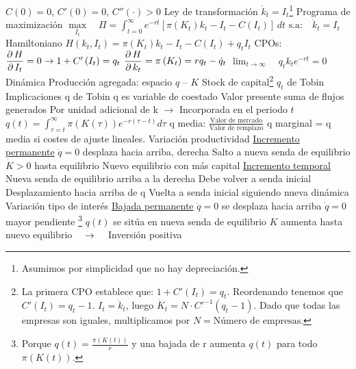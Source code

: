 \documentclass{nuevotema}
\begin{document}
\begin{esquemal}
				\4[] $C(0)=0$, $C'(0)=0$, $C''(\cdot) > 0$
			\3 Ley de transformación
				\4 $\dot{k}_t = I_t$\footnote{Asumimos por simplicidad que no hay depreciación.}
			\3 Programa de maximización
				\4 $\underset{I_t}{\max} \quad \Pi = \int_{t=0}^\infty e^{-rt} \left[ \pi \left(  K_t \right) k_t - I_t - C \left( I_t \right) \right] \, dt$
				\4[] $\text{s.a:} \quad \dot{k}_t = I_t$
			\3 Hamiltoniano
				\4 $H\left( k_t, I_t \right) = \pi \left( K_t \right) k_t - I_t - C\left( I_t \right) + q_t I_t$
				\4 CPOs:
				\4 $\dfrac{\partial \, H}{\partial \, I_t} = 0 \rightarrow 1 + C'\left( I_t \right) = q_t$
				\4 $\dfrac{\partial \, H}{\partial \, k_t} = \pi \left( K_t \right) = rq_t - \dot{q}_t$
				\4 $\lim_{t \to \infty} \quad q_t k_t e^{-rt} = 0$
			\3 Dinámica
				\4 Producción agregada: espacio $q$ -- $K$
				\4 Stock de capital\footnote{La primera CPO establece que: $1 + C'\left( I_t \right) = q_t$. Reordenando tenemos que $C'\left( I_t \right) = q_t - 1$. $I_t = \dot{k}_t$, luego $\dot{K}_t = N \cdot C'^{-1}\left(q_t - 1 \right)$. Dado que todas las empresas son iguales, multiplicamos por $N=\text{Número de empresas}$.}
				\4[] 
				\4 $q_t$ de Tobin
				\4[] 
				\4 
		\2 Implicaciones
			\3 q de Tobin
				\4 q es variable de coestado
				\4 Valor presente suma de flujos generados
				\4[] Por unidad adicional de k
				\4[] $\to$ Incorporada en el periodo $t$
				\4 $q(t) = \int_{\tau=t}^{\infty} \pi(K(\tau)) e^{-r(\tau -t)} d \tau$
				\4 q media: $\frac{\text{Valor de mercado}}{\text{Valor de remplazo}}$
				\4 q marginal = q media si costes de ajuste lineales.
			\3 Variación productividad
				\4 \underline{Incremento permanente}
				\4 $\dot{q} = 0$ desplaza hacia arriba, derecha
				\4[] Salto a nueva senda de equilibrio
				\4[] $\dot{K} >0$ hasta equilibrio
				\4[] Nuevo equilibrio con más capital
				\4[] 
				\4 \underline{Incremento temporal}
				\4 Nueva senda de equilibrio arriba a la derecha
				\4 Debe volver a senda inicial
				\4[] Desplazamiento hacia arriba de q
				\4[] Vuelta a senda inicial siguiendo nueva dinámica
				\4[] 
			\3 Variación tipo de interés
				\4 \underline{Bajada permanente}
				\4[] $\dot{q} = 0$ se desplaza hacia arriba
				\4[] $\dot{q} = 0$ mayor pendiente \footnote{Porque $q(t) = \frac{\pi \left( K(t) \right)}{r}$ y una bajada de r aumenta $q(t)$ para todo $\pi \left( K(t) \right)$.}
				\4[] $q(t)$ se sitúa en nueva senda de equilibrio
				\4[] $K$ aumenta hasta nuevo equilibrio $\quad \rightarrow \quad$ Inversión positiva

\end{esquemal}
\end{document}
